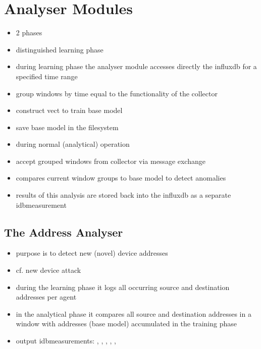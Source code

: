 \section{Analyser Modules}
\label{sec:concept:anal}

\begin{itemize}
	\item 2 phases
	\item distinguished learning phase
	\item during learning phase the analyser module accesses directly the \gls{influxdb} for a specified time range
	\item group windows by time equal to the functionality of the collector
	\item construct \gls{vect} to train base model
	\item save base model in the filesystem
	
	\item during normal (analytical) operation
	\item accept grouped windows from collector via message exchange
	\item compares current window groups to base model to detect anomalies
	\item results of this analysis are stored back into the \gls{influxdb} as a separate \gls{idbmeasurement}
\end{itemize}

\subsection{The Address Analyser}
\label{sec:concept:anal:addr}

\begin{itemize}
	\item purpose is to detect new (novel) device addresses
	\item cf. new device attack
	\item during the learning phase it logs all occurring source and destination addresses per agent
	\item in the analytical phase it compares all source and destination addresses in a window with addresses (base model) accumulated in the training phase
	\item output \glspl{idbmeasurement}: , , , , , 
\end{itemize}


